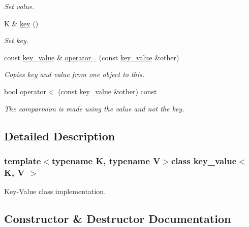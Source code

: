 \begin{DoxyCompactItemize}
\begin{DoxyCompactList}\small\item\em Set value. \end{DoxyCompactList}\item 
\hypertarget{classkey__value_a5ac8d2186f8475467cba4fce559a2d17}{}K \& \hyperlink{classkey__value_a5ac8d2186f8475467cba4fce559a2d17}{key} ()\label{classkey__value_a5ac8d2186f8475467cba4fce559a2d17}

\begin{DoxyCompactList}\small\item\em Set key. \end{DoxyCompactList}\item 
\hypertarget{classkey__value_af5aed228f1e149228c34dac160463dd3}{}const \hyperlink{classkey__value}{key\+\_\+value} \& \hyperlink{classkey__value_af5aed228f1e149228c34dac160463dd3}{operator=} (const \hyperlink{classkey__value}{key\+\_\+value} \&other)\label{classkey__value_af5aed228f1e149228c34dac160463dd3}

\begin{DoxyCompactList}\small\item\em Copies key and value from one object to this. \end{DoxyCompactList}\item 
\hypertarget{classkey__value_ad272d54cc397dec6f07cfba350f7ae1d}{}bool \hyperlink{classkey__value_ad272d54cc397dec6f07cfba350f7ae1d}{operator$<$} (const \hyperlink{classkey__value}{key\+\_\+value} \&other) const \label{classkey__value_ad272d54cc397dec6f07cfba350f7ae1d}

\begin{DoxyCompactList}\small\item\em The comparision is made using the value and not the key. \end{DoxyCompactList}\end{DoxyCompactItemize}


\subsection{Detailed Description}
\subsubsection*{template$<$typename K, typename V$>$class key\+\_\+value$<$ K, V $>$}

Key-\/\+Value class implementation. 

\subsection{Constructor \& Destructor Documentation}
\hypertarget{classkey__value_ad3a7caf2cf9eff66215ee4983c2f4bce}{}

